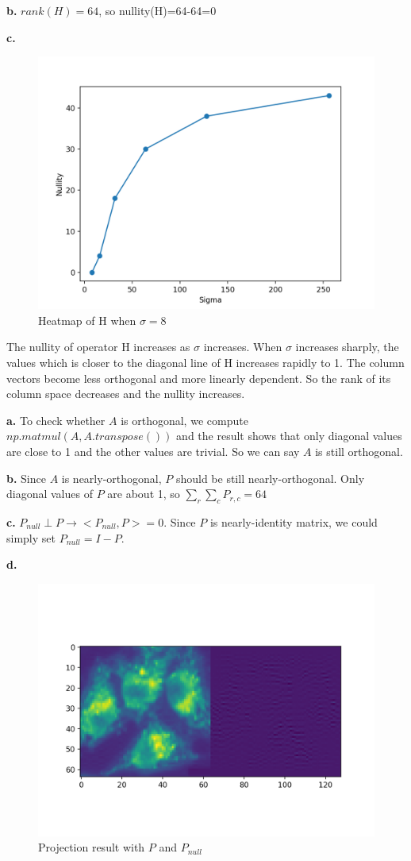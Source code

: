 \documentclass[11pt,a4paper]{article}
\begin{document}
\textbf{b.} $rank(H)=64$, so nullity(H)=64-64=0

\textbf{c.}
\begin{figure}[!ht]
    \centering
    \includegraphics[width=0.6\linewidth]{ex7_nullity.png}
    \caption{Heatmap of H when $\sigma=8$}
\end{figure}

The nullity of operator H increases as $\sigma$ increases. When $\sigma$ increases sharply, the values which is closer to the diagonal line of H increases rapidly to 1. The column vectors become less orthogonal and more linearly dependent. So the rank of its column space decreases and the nullity increases.

\newpage
{}
\textbf{a.}
To check whether $A$ is orthogonal, we compute $np.matmul(A, A.transpose())$ and the result shows that only diagonal values are close to 1 and the other values are trivial. So we can say $A$ is still orthogonal. 

\textbf{b.} 
Since $A$ is nearly-orthogonal, $P$ should be still nearly-orthogonal. Only diagonal values of $P$ are about 1, so $\sum_r\sum_cP_{r,c}=64$

\textbf{c.}
$P_{null}\perp P\rightarrow <P_{null}, P>=0$. Since $P$ is nearly-identity matrix, we could simply set $P_{null}=I-P$.

\textbf{d.}
\vspace{-1cm}
\begin{figure}[!ht]
    \centering
    \includegraphics[width=0.6\linewidth]{ex8_forward.png}
    \vspace{-1cm}
    \caption{Projection result with $P$ and $P_{null}$}
\end{figure}
\end{document}
